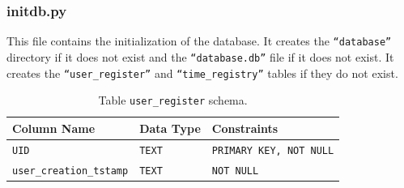 \documentclass{article}
\begin{document}
\subsubsection{initdb.py}
This file contains the initialization of the database.
It creates the \texttt{``database''} directory if it does not exist and the \texttt{``database.db''} file if it does not exist.
It creates the \texttt{``user\_register''} and \texttt{``time\_registry''} tables if they do not exist.

\begin{table}[H]
	\centering
	\begin{tabular}{|l|l|l|}
	\hline
	\textbf{Column Name} & \textbf{Data Type} & \textbf{Constraints} \\ \hline
	\texttt{UID} & \texttt{TEXT} & \texttt{PRIMARY KEY, NOT NULL} \\ \hline
	\texttt{user\_creation\_tstamp} & \texttt{TEXT} & \texttt{NOT NULL} \\ \hline
	\end{tabular}
	\caption{Table \texttt{user\_register} schema.}
	\end{table}
\end{document}
